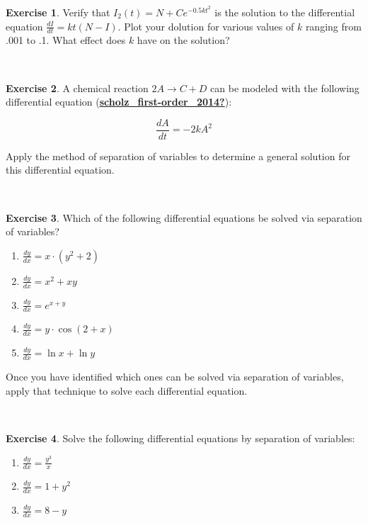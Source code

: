\documentclass[
]{book}
\theoremstyle{definition}
\theoremstyle{definition}
\theoremstyle{definition}
\newtheorem{exercise}{Exercise}[chapter]
\theoremstyle{remark}
\begin{document}
\begin{exercise}
\protect\hypertarget{exr:unnamed-chunk-119}{}{\label{exr:unnamed-chunk-119} }Verify that \(I_{2}(t) = N + C e^{-0.5 k t^{2}}\) is the solution to the differential equation \(\displaystyle \frac{dI}{dt} = kt (N-I)\). Plot your dolution for various values of \(k\) ranging from .001 to .1. What effect does \(k\) have on the solution?
\end{exercise}

~

\begin{exercise}
\protect\hypertarget{exr:unnamed-chunk-120}{}{\label{exr:unnamed-chunk-120} }A chemical reaction \(2A \rightarrow C + D\) can be modeled with the following differential equation (\protect\hyperlink{ref-scholz_first-order_2014}{\textbf{scholz\_first-order\_2014?}}):

\begin{equation}
\frac{dA}{dt} = -2 k A^{2}
\end{equation}

Apply the method of separation of variables to determine a general solution for this differential equation.
\end{exercise}

~

\begin{exercise}
\protect\hypertarget{exr:unnamed-chunk-121}{}{\label{exr:unnamed-chunk-121} }Which of the following differential equations be solved via separation of variables?

\begin{enumerate}
\item $\displaystyle \frac{dy}{dx} = x \cdot (y^{2}+2)$
\item $\displaystyle \frac{dy}{dx} = x^{2} + xy$
\item $\displaystyle \frac{dy}{dx} = e^{x+y}$
\item $\displaystyle \frac{dy}{dx} = y \cdot \cos(2+x)$
\item $\displaystyle \frac{dy}{dx} = \ln x + \ln y$
\end{enumerate}

Once you have identified which ones can be solved via separation of variables, apply that technique to solve each differential equation.
\end{exercise}

~

\begin{exercise}
\protect\hypertarget{exr:unnamed-chunk-122}{}{\label{exr:unnamed-chunk-122} }Solve the following differential equations by separation of variables:

\begin{enumerate}
\item $\displaystyle \frac{dy}{dx} = \frac{y^{3}}{x}$
\item $\displaystyle \frac{dy}{dx} = 1+y^{2}$
\item $\displaystyle \frac{dy}{dx} = 8-y$
\end{enumerate}
\end{exercise}
\end{document}
